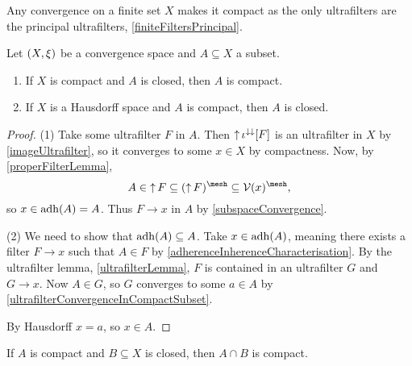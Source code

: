 \begin{example}
Any convergence on a finite set $X$ makes it compact as the only ultrafilters are the principal ultrafilters, \ref{finiteFiltersPrincipal}.
\end{example}

\begin{proposition} \label{compactClosedSets}
Let $\left( X,\xi \right)$ be a convergence space and $A\subseteq X$ a subset.
\begin{enumerate}
\item If $X$ is compact and $A$ is closed, then $A$ is compact.
\item If $X$ is a Hausdorff space and $A$ is compact, then $A$ is closed.
\end{enumerate}
\end{proposition}
\begin{proof}
(1) Take some ultrafilter $F$ in $A$. Then $\operatorname{\uparrow} \iota^{\downarrow\downarrow}[F]$ is an ultrafilter in $X$ by \ref{imageUltrafilter}, so it converges to some $x\in X$ by compactness. Now, by \ref{properFilterLemma},
\[ A \in \upset F \subseteq (\upset F)^{\mesh} \subseteq \vicinity(x)^{\mesh}, \]
so $x\in \operatorname{adh}(A) = A$. Thus $F \to x$ in $A$ by \ref{subspaceConvergence}.

(2) We need to show that $\operatorname{adh}(A)\subseteq A$. Take $x\in \operatorname{adh}(A)$, meaning there exists a filter $F\to x$ such that $A\in F$ by \ref{adherenceInherenceCharacterisation}. By the ultrafilter lemma, \ref{ultrafilterLemma}, $F$ is contained in an ultrafilter $G$ and $G\to x$. Now $A\in G$, so $G$ converges to some $a\in A$ by \ref{ultrafilterConvergenceInCompactSubset}.

By Hausdorff $x = a$, so $x\in A$.
\end{proof}
\begin{corollary}
If $A$ is compact and $B\subseteq X$ is closed, then $A\cap B$ is compact.
\end{corollary}

